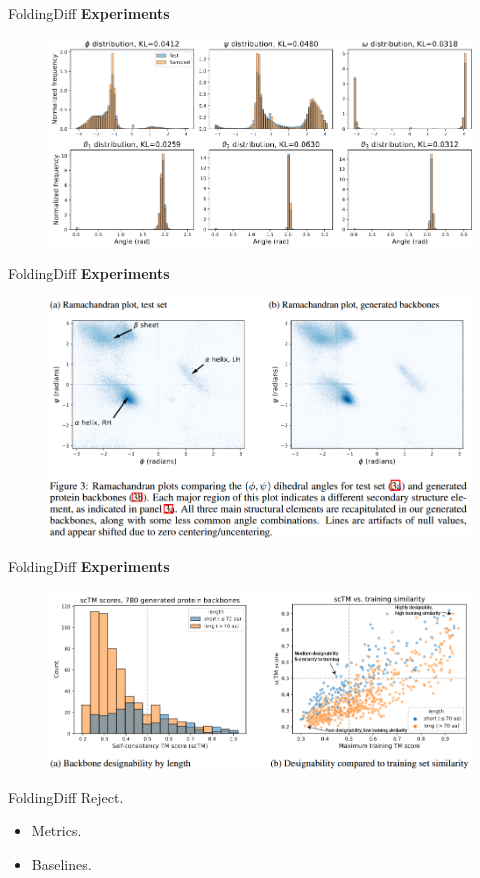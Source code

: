 \documentclass[notheorems, aspectratio=54]{beamer}
\begin{document}
\begin{frame}{FoldingDiff}
  \textbf{Experiments}
  \begin{figure}[!h]
    \centering
    \includegraphics[width=1.0\linewidth]{figures/Foldingdiff_fig2.png}
  \end{figure}
\end{frame}

\begin{frame}{FoldingDiff}
  \textbf{Experiments}
  \begin{figure}[!h]
    \centering
    \includegraphics[width=1.0\linewidth]{figures/Foldingdiff_fig3.png}
  \end{figure}
\end{frame}

\begin{frame}{FoldingDiff}
  \textbf{Experiments}
  \begin{figure}[!h]
    \centering
    \includegraphics[width=1.0\linewidth]{figures/Foldingdiff_fig5.png}
  \end{figure}
\end{frame}

\begin{frame}{FoldingDiff}
  Reject.
  \begin{itemize}
    \item Metrics.
    \item Baselines.
  \end{itemize}
\end{frame}
\end{document}
